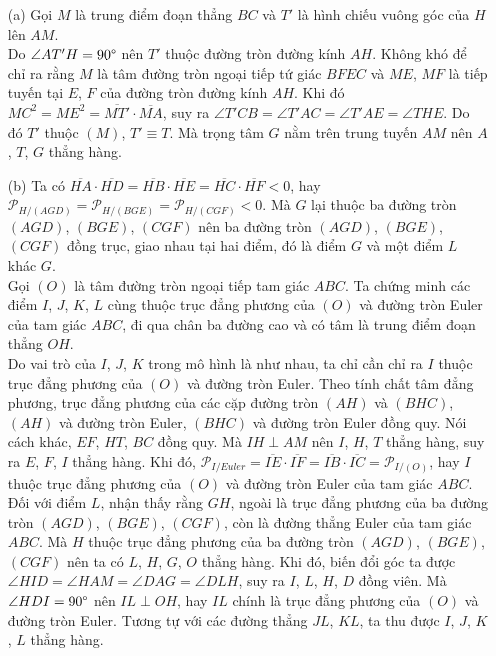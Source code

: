         \begin{solution}
            \hfill
            \begin{enumerate}
                \item[(a)] Gọi \(M\) là trung điểm đoạn thẳng \(BC\) và \(T'\) là hình chiếu vuông góc của \(H\) lên \(AM\).\\
                Do \(\angle AT'H = 90 \degree\) nên \(T'\) thuộc đường tròn đường kính \(AH\). Không khó để chỉ ra rằng \(M\) là tâm đường tròn ngoại tiếp tứ giác \(BFEC\) và \(ME\), \(MF\) là tiếp tuyến tại \(E\), \(F\) của đường tròn đường kính \(AH\). Khi đó \(MC^2 = ME^2 = \overline{MT'} \cdot \overline{MA}\), suy ra \(\angle T'CB = \angle T'AC = \angle T'AE = \angle THE\). Do đó \(T'\) thuộc \((M)\), \(T' \equiv T\). Mà trọng tâm \(G\) nằm trên trung tuyến \(AM\) nên \(A\), \(T\), \(G\) thẳng hàng.
                \item[(b)] Ta có \(\overline{HA} \cdot \overline{HD} = \overline{HB} \cdot \overline{HE} = \overline{HC} \cdot \overline{HF} < 0\), hay \(\mathcal{P}_{H/(AGD)} = \mathcal{P}_{H/(BGE)} = \mathcal{P}_{H/(CGF)} < 0\). Mà \(G\) lại thuộc ba đường tròn \((AGD)\), \((BGE)\), \((CGF)\) nên ba đường tròn \((AGD)\), \((BGE)\), \((CGF)\) đồng trục, giao nhau tại hai điểm, đó là điểm \(G\) và một điểm \(L\) khác \(G\).\\
                Gọi \((O)\) là tâm đường tròn ngoại tiếp tam giác \(ABC\). Ta chứng minh các điểm \(I\), \(J\), \(K\), \(L\) cùng thuộc trục đẳng phương của \((O)\) và đường tròn Euler của tam giác \(ABC\), đi qua chân ba đường cao và có tâm là trung điểm đoạn thẳng \(OH\).\\
                Do vai trò của \(I\), \(J\), \(K\) trong mô hình là như nhau, ta chỉ cần chỉ ra \(I\) thuộc trục đẳng phương của \((O)\) và đường tròn Euler. Theo tính chất tâm đẳng phương, trục đẳng phương của các cặp đường tròn \((AH)\) và \((BHC)\), \((AH)\) và đường tròn Euler, \((BHC)\) và đường tròn Euler đồng quy. Nói cách khác, \(EF\), \(HT\), \(BC\) đồng quy. Mà \(IH \perp AM\) nên \(I\), \(H\), \(T\) thẳng hàng, suy ra \(E\), \(F\), \(I\) thẳng hàng. Khi đó, \(\mathcal{P}_{I/Euler} = \overline{IE} \cdot \overline{IF} = \overline{IB} \cdot \overline{IC} = \mathcal{P}_{I/(O)}\), hay \(I\) thuộc trục đẳng phương của \((O)\) và đường tròn Euler của tam giác \(ABC\).\\
                Đối với điểm \(L\), nhận thấy rằng \(GH\), ngoài là trục đẳng phương của ba đường tròn \((AGD)\), \((BGE)\), \((CGF)\), còn là đường thẳng Euler của tam giác \(ABC\). Mà \(H\) thuộc trục đẳng phương của ba đường tròn \((AGD)\), \((BGE)\), \((CGF)\) nên ta có \(L\), \(H\), \(G\), \(O\) thẳng hàng. Khi đó, biến đổi góc ta được \(\angle HID = \angle HAM = \angle DAG = \angle DLH\), suy ra \(I\), \(L\), \(H\), \(D\) đồng viên. Mà \(\angle HDI = 90 \degree\) nên \(IL \perp OH\), hay \(IL\) chính là trục đẳng phương của \((O)\) và đường tròn Euler. Tương tự với các đường thẳng \(JL\), \(KL\), ta thu được \(I\), \(J\), \(K\), \(L\) thẳng hàng.
            \end{enumerate}
        \end{solution}

